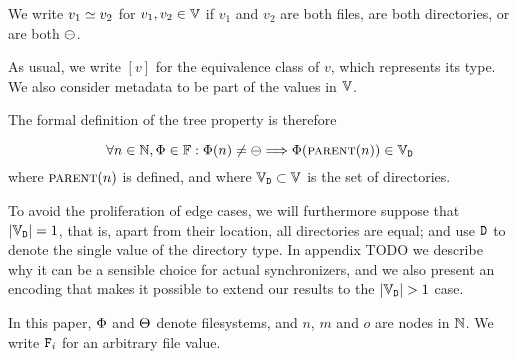 \begin{mydef}
We write $v_1\simeq v_2$ for $v_1,v_2\in\mathbb{V}$ if $v_1$ and $v_2$ are both files,
are both directories, or are both $\ominus$.
\end{mydef}

As usual, we write $[v]$ for the equivalence class of $v$, which represents its type.
We also consider metadata to be part of the values in $\mathbb{V}$.

The formal definition of the tree property is therefore
\begin{mydef}
\[ \forall n\in\mathbb{N}, \Phi\in\mathbb{F}: \Phi(n) \neq \ominus \Longrightarrow \Phi(\text{\normalfont\scshape{parent}}(n)) \in \mathbb{V}_{\mathtt{D}} \]
where $\text{\normalfont\scshape{parent}}(n)$ is defined, and where $\mathbb{V}_{\mathtt{D}}\subset\mathbb{V}$ is the set of directories.
\end{mydef}

To avoid the proliferation of edge cases, we will furthermore suppose that
$|\mathbb{V}_{\mathtt{D}}|=1$, that is, apart from their location, all directories are equal;
and use $\mathtt{D}$ to denote the single value of the directory type.
In appendix TODO we describe why it can be a sensible choice
for actual synchronizers, and we also present an encoding that makes it possible
to extend our results to the $|\setd|>1$ case.



% 
% 

In this paper, $\Phi$ and $\Theta$ denote filesystems,
and $n$, $m$ and $o$ are nodes in $\mathbb{N}$.
We write $\mathtt{F}_i$ for an arbitrary file value. %

